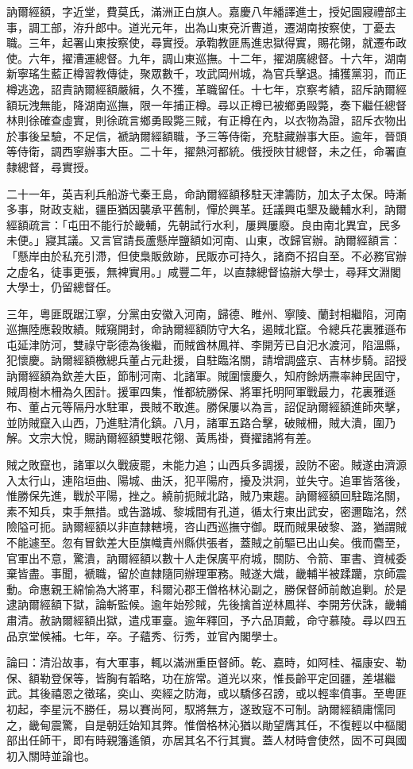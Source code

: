 \begin{pinyinscope}
訥爾經額，字近堂，費莫氏，滿洲正白旗人。嘉慶八年繙譯進士，授妃園寢禮部主事，調工部，洊升郎中。道光元年，出為山東兗沂曹道，遷湖南按察使，丁憂去職。三年，起署山東按察使，尋實授。承鞫教匪馬進忠獄得實，賜花翎，就遷布政使。六年，擢漕運總督。九年，調山東巡撫。十二年，擢湖廣總督。十六年，湖南新寧瑤生藍正樽習教傳徒，聚眾數千，攻武岡州城，為官兵擊退。捕獲黨羽，而正樽逃逸，詔責訥爾經額嚴緝，久不獲，革職留任。十七年，京察考績，詔斥訥爾經額玩洩無能，降湖南巡撫，限一年捕正樽。尋以正樽已被鄉勇毆斃，奏下繼任總督林則徐確查虛實，則徐疏言鄉勇毆斃三賊，有正樽在內，以衣物為證，詔斥衣物出於事後呈驗，不足信，褫訥爾經額職，予三等侍衛，充駐藏辦事大臣。逾年，晉頭等侍衛，調西寧辦事大臣。二十年，擢熱河都統。俄授陜甘總督，未之任，命署直隸總督，尋實授。

二十一年，英吉利兵船游弋秦王島，命訥爾經額移駐天津籌防，加太子太保。時漸多事，財政支絀，疆臣猶因襲承平舊制，憚於興革。廷議興屯墾及畿輔水利，訥爾經額疏言：「屯田不能行於畿輔，先朝試行水利，屢興屢廢。良由南北異宜，民多未便。」寢其議。又言官請長蘆懸岸鹽額如河南、山東，改歸官辦。訥爾經額言：「懸岸由於私充引滯，但使梟販斂跡，民販亦可持久，諸商不招自至。不必務官辦之虛名，徒事更張，無裨實用。」咸豐二年，以直隸總督協辦大學士，尋拜文淵閣大學士，仍留總督任。

三年，粵匪既踞江寧，分黨由安徽入河南，歸德、睢州、寧陵、蘭封相繼陷，河南巡撫陸應穀敗績。賊窺開封，命訥爾經額防守大名，遏賊北竄。令總兵花裏雅遜布屯延津防河，雙祿守彰德為後繼，而賊酋林鳳祥、李開芳已自汜水渡河，陷溫縣，犯懷慶。訥爾經額檄總兵董占元赴援，自駐臨洺關，請增調盛京、吉林步騎。詔授訥爾經額為欽差大臣，節制河南、北諸軍。賊圍懷慶久，知府餘炳燾率紳民固守，賊周樹木柵為久困計。援軍四集，惟都統勝保、將軍托明阿軍戰最力，花裏雅遜布、董占元等隔丹水駐軍，畏賊不敢進。勝保屢以為言，詔促訥爾經額進師夾擊，並防賊竄入山西，乃進駐清化鎮。八月，諸軍五路合擊，破賊柵，賊大潰，圍乃解。文宗大悅，賜訥爾經額雙眼花翎、黃馬褂，賚擢諸將有差。

賊之敗竄也，諸軍以久戰疲罷，未能力追；山西兵多調援，設防不密。賊遂由濟源入太行山，連陷垣曲、陽城、曲沃，犯平陽府，擾及洪洞，並失守。追軍皆落後，惟勝保先進，戰於平陽，挫之。繞前扼賊北路，賊乃東趨。訥爾經額回駐臨洺關，素不知兵，束手無措。或告潞城、黎城間有孔道，循太行東出武安，密邇臨洺，然險隘可扼。訥爾經額以非直隸轄境，咨山西巡撫守御。既而賊果破黎、潞，猶謂賊不能遽至。忽有冒欽差大臣旗幟責州縣供張者，蓋賊之前驅已出山矣。俄而麕至，官軍出不意，驚潰，訥爾經額以數十人走保廣平府城，關防、令箭、軍書、資械委棄皆盡。事聞，褫職，留於直隸隨同辦理軍務。賊遂大熾，畿輔半被蹂躪，京師震動。命惠親王綿愉為大將軍，科爾沁郡王僧格林沁副之，勝保督師前敵追剿。於是逮訥爾經額下獄，論斬監候。逾年始殄賊，先後擒首逆林鳳祥、李開芳伏誅，畿輔肅清。赦訥爾經額出獄，遣戍軍臺。逾年釋回，予六品頂戴，命守慕陵。尋以四五品京堂候補。七年，卒。子蘊秀、衍秀，並官內閣學士。

論曰：清沿故事，有大軍事，輒以滿洲重臣督師。乾、嘉時，如阿桂、福康安、勒保、額勒登保等，皆胸有韜略，功在旂常。道光以來，惟長齡平定回疆，差堪繼武。其後禧恩之徵瑤，奕山、奕經之防海，或以驕侈召謗，或以輕率僨事。至粵匪初起，李星沅不勝任，易以賽尚阿，馭將無方，遂致寇不可制。訥爾經額庸懦同之，畿甸震驚，自是朝廷始知其弊。惟僧格林沁猶以勛望膺其任，不復輕以中樞閣部出任師干，即有時親籓遙領，亦居其名不行其實。蓋人材時會使然，固不可與國初入關時並論也。


\end{pinyinscope}